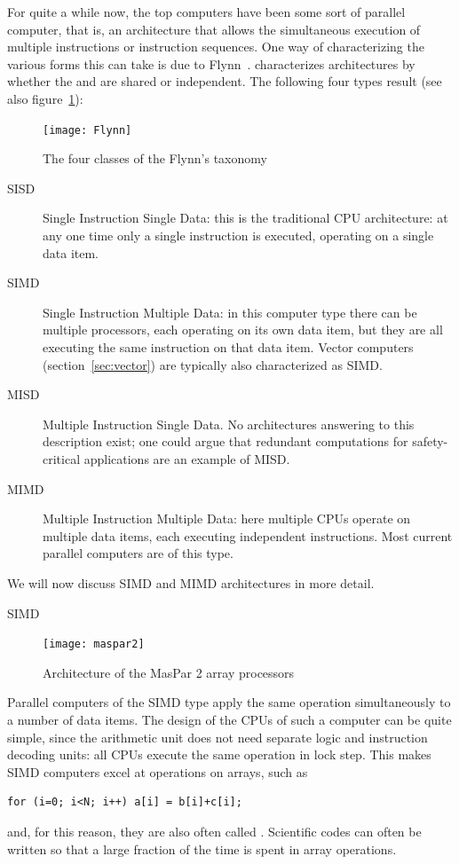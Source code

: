 For quite a while now, the top computers have been
some sort of parallel computer, that is, an architecture that allows
the simultaneous execution of multiple instructions or instruction
sequences. One way of characterizing the various forms this can take
is due to Flynn~\cite{flynn:taxonomy}.  
characterizes architectures by whether the 
and  are shared or independent.
The following four types result (see also figure~\ref{fig:flynn}):
\begin{figure}[t]
  \texttt{[image: Flynn]}
  \caption{The four classes of the Flynn's taxonomy}
  \label{fig:flynn}
\end{figure}
\begin{description}
\item[SISD] Single Instruction Single Data: this is the traditional
  CPU architecture: at any one time only a single instruction is
  executed, operating on a single data item.
\item[SIMD] Single Instruction Multiple Data: in this computer type
  there can be multiple processors, each operating on its own data
  item, but they are all executing the same instruction on that data
  item. Vector computers (section~\ref{sec:vector}) are typically also
  characterized as SIMD.
\item[MISD] Multiple Instruction Single Data. No architectures
  answering to this description exist; one could argue that
  redundant computations for safety-critical applications are an
  example of MISD.
\item[MIMD] Multiple Instruction Multiple Data: here multiple CPUs
  operate on multiple data items, each executing independent
  instructions. Most current parallel computers are of this
  type.
\end{description}

We will now discuss SIMD and MIMD architectures in more detail.

 {SIMD}
\label{sec:simd}

\begin{lulu}
  \begin{figure}
    \texttt{[image: maspar2]}
    \caption{Architecture of the MasPar 2 array processors}
    \label{fig:maspar}
  \end{figure}
\end{lulu}
%
Parallel computers of the SIMD type apply the same operation
simultaneously to a number of data items. The design of the CPUs of
such a computer can be quite simple, since the arithmetic unit does
not need separate logic and instruction decoding units: all CPUs
execute the same operation in lock step. 
This makes SIMD computers excel at operations on arrays, such as
%
\begin{verbatim}
for (i=0; i<N; i++) a[i] = b[i]+c[i];
\end{verbatim}
and, for this reason, they are also often called . Scientific codes can often be written so that
a large fraction of the time is spent in array operations.

